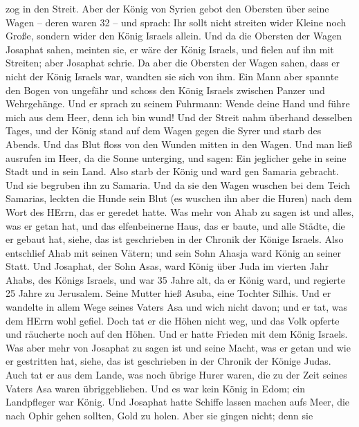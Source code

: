 zog in den Streit.  Aber der König von Syrien gebot den
Obersten über seine Wagen -- deren waren 32 -- und sprach: Ihr sollt
nicht streiten wider Kleine noch Große, sondern wider den König Israels
allein.  Und da die Obersten der Wagen Josaphat sahen,
meinten sie, er wäre der König Israels, und fielen auf ihn mit Streiten;
aber Josaphat schrie.  Da aber die Obersten der Wagen
sahen, dass er nicht der König Israels war, wandten sie sich von ihm.
 Ein Mann aber spannte den Bogen von ungefähr und schoss
den König Israels zwischen Panzer und Wehrgehänge. Und er sprach zu
seinem Fuhrmann: Wende deine Hand und führe mich aus dem Heer, denn ich
bin wund!  Und der Streit nahm überhand desselben Tages,
und der König stand auf dem Wagen gegen die Syrer und starb des Abends.
Und das Blut floss von den Wunden mitten in den Wagen.  Und
man ließ ausrufen im Heer, da die Sonne unterging, und sagen: Ein
jeglicher gehe in seine Stadt und in sein Land.  Also starb
der König und ward gen Samaria gebracht. Und sie begruben ihn zu
Samaria.  Und da sie den Wagen wuschen bei dem Teich
Samarias, leckten die Hunde sein Blut (es wuschen ihn aber die Huren)
nach dem Wort des HErrn, das er geredet hatte.  Was mehr
von Ahab zu sagen ist und alles, was er getan hat, und das elfenbeinerne
Haus, das er baute, und alle Städte, die er gebaut hat, siehe, das ist
geschrieben in der Chronik der Könige Israels.  Also
entschlief Ahab mit seinen Vätern; und sein Sohn Ahasja ward König an
seiner Statt.  Und Josaphat, der Sohn Asas, ward König über
Juda im vierten Jahr Ahabs, des Königs Israels,  und war 35
Jahre alt, da er König ward, und regierte 25 Jahre zu Jerusalem. Seine
Mutter hieß Asuba, eine Tochter Silhis.  Und er wandelte in
allem Wege seines Vaters Asa und wich nicht davon; und er tat, was dem
HErrn wohl gefiel.  Doch tat er die Höhen nicht weg, und
das Volk opferte und räucherte noch auf den Höhen.  Und er
hatte Frieden mit dem König Israels.  Was aber mehr von
Josaphat zu sagen ist und seine Macht, was er getan und wie er
gestritten hat, siehe, das ist geschrieben in der Chronik der Könige
Judas.  Auch tat er aus dem Lande, was noch übrige Hurer
waren, die zu der Zeit seines Vaters Asa waren übriggeblieben.
 Und es war kein König in Edom; ein Landpfleger war König.
 Und Josaphat hatte Schiffe lassen machen aufs Meer, die
nach Ophir gehen sollten, Gold zu holen. Aber sie gingen nicht; denn sie
